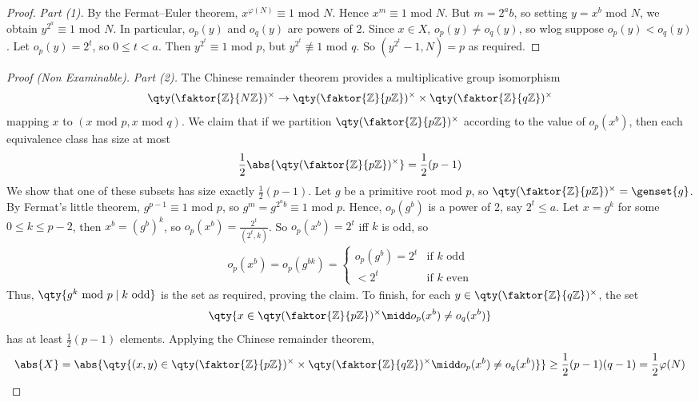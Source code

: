\begin{proof}
    \emph{Part (1).}
    By the Fermat--Euler theorem, $x^{\varphi(N)} \equiv 1$ mod $N$.
    Hence $x^m \equiv 1$ mod $N$.
    But $m = 2^a b$, so setting $y = x^b$ mod $N$, we obtain $y^{2^a} \equiv 1$ mod $N$.
    In particular, $o_p(y)$ and $o_q(y)$ are powers of 2.
    Since $x \in X$, $o_p(y) \neq o_q(y)$, so wlog suppose $o_p(y) < o_q(y)$.
    Let $o_p(y) = 2^t$, so $0 \leq t < a$.
    Then $y^{2^t} \equiv 1$ mod $p$, but $y^{2^t} \not\equiv 1$ mod $q$.
    So $(y^{2^t} - 1, N) = p$ as required.
\end{proof}

\begin{proof}[Proof (Non Examinable)]
    \emph{Part (2).}
    The Chinese remainder theorem provides a multiplicative group isomorphism
    \begin{align*}
        \qty(\faktor{\mathbb Z}{N\mathbb Z})^\times \to \qty(\faktor{\mathbb Z}{p\mathbb Z})^\times \times \qty(\faktor{\mathbb Z}{q\mathbb Z})^\times
    \end{align*}
    mapping $x$ to $(x \text{ mod } p, x \text{ mod } q)$.
    We claim that if we partition $\qty(\faktor{\mathbb Z}{p\mathbb Z})^\times$ according to the value of $o_p(x^b)$, then each equivalence class has size at most
    \begin{align*}
        \frac{1}{2} \abs{\qty(\faktor{\mathbb Z}{p\mathbb Z})^\times} = \frac{1}{2}(p-1)
    \end{align*}
    We show that one of these subsets has size exactly $\frac{1}{2}(p-1)$.
    Let $g$ be a primitive root mod $p$, so $\qty(\faktor{\mathbb Z}{p\mathbb Z})^\times = \genset{g}$.
    By Fermat's little theorem, $g^{p-1} \equiv 1$ mod $p$, so $g^m = g^{2^a b} \equiv 1$ mod $p$.
    Hence, $o_p(g^b)$ is a power of 2, say $2^t \leq a$.
    Let $x = g^k$ for some $0 \leq k \leq p - 2$, then $x^b = (g^b)^k$, so $o_p(x^b) = \frac{2^t}{(2^t, k)}$.
    So $o_p(x^b) = 2^t$ iff $k$ is odd, so
    \begin{align*}
        o_p(x^b) = o_p(g^{bk}) =
        \begin{cases}
            o_p(g^b) = 2^t & \text{if } k \text{ odd} \\
            < 2^t & \text{if } k \text{ even}
        \end{cases}
    \end{align*}
    Thus, $\qty{g^k \text{ mod } p \mid k \text{ odd}}$ is the set as required, proving the claim.
    To finish, for each $y \in \qty(\faktor{\mathbb Z}{q\mathbb Z})^\times$, the set
    \begin{align*}
        \qty{x \in \qty(\faktor{\mathbb Z}{p\mathbb Z})^\times \midd o_p(x^b) \neq o_q(x^b)}
    \end{align*}
    has at least $\frac{1}{2}(p-1)$ elements.
    Applying the Chinese remainder theorem,
    \begin{align*}
        \abs{X} = \abs{\qty{(x,y) \in \qty(\faktor{\mathbb Z}{p\mathbb Z})^\times \times \qty(\faktor{\mathbb Z}{q\mathbb Z})^\times \midd o_p(x^b) \neq o_q(x^b)}} \geq \frac{1}{2}(p-1)(q-1) = \frac{1}{2}\varphi(N)
    \end{align*}
\end{proof}

